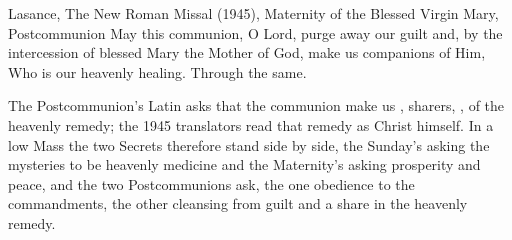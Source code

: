 \begin{englishwitness}{Lasance, The New Roman Missal (1945), Maternity of the Blessed Virgin Mary, Postcommunion}
May this communion, O Lord, purge away our guilt and, by the intercession of
blessed Mary the Mother of God, make us companions of Him, Who is our heavenly
healing. Through the same.
\end{englishwitness}

\noindent The Postcommunion's Latin asks that the communion make us
, sharers, , of the heavenly remedy;
the 1945 translators read that remedy as Christ himself. In a low Mass the two
Secrets therefore stand side by side, the Sunday's asking the mysteries to be
heavenly medicine and the Maternity's asking prosperity and peace, and the two
Postcommunions ask, the one obedience to the commandments, the other cleansing
from guilt and a share in the heavenly remedy.
